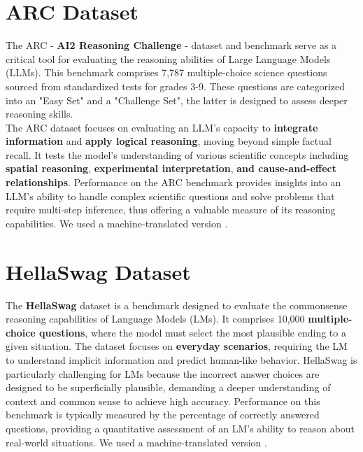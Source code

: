 \documentclass{article}
\begin{document}
	\appendix
	
	\section{ARC Dataset}
	The ARC - \textbf{AI2 Reasoning Challenge} - dataset and benchmark serve as a critical tool for evaluating the reasoning abilities of Large Language Models (LLMs). This benchmark comprises 7,787 multiple-choice science questions sourced from standardized tests for grades 3-9.  These questions are categorized into an "Easy Set" and a "Challenge Set", the latter is designed to assess deeper reasoning skills.  \\
	The ARC dataset focuses on evaluating an LLM's capacity to \textbf{integrate information} and \textbf{apply logical reasoning}, moving beyond simple factual recall.  It tests the model's understanding of various scientific concepts including \textbf{spatial reasoning}, \textbf{experimental interpretation}, \textbf{and cause-and-effect relationships}.  Performance on the ARC benchmark provides insights into an LLM's ability to handle complex scientific questions and solve problems that require multi-step inference, thus offering a valuable measure of its reasoning capabilities.
	We used a machine-translated version \cite{dac2023okapi}.
	
	\section{HellaSwag Dataset}
	The \textbf{HellaSwag} dataset is a benchmark designed to evaluate the commonsense reasoning capabilities of Language Models (LMs). It comprises 10,000 \textbf{multiple-choice questions}, where the model must select the most plausible ending to a given situation.  The dataset focuses on \textbf{everyday scenarios}, requiring the LM to understand implicit information and predict human-like behavior.  HellaSwag is particularly challenging for LMs because the incorrect answer choices are designed to be superficially plausible, demanding a deeper understanding of context and common sense to achieve high accuracy.  Performance on this benchmark is typically measured by the percentage of correctly answered questions, providing a quantitative assessment of an LM's ability to reason about real-world situations.
	We used a machine-translated version \cite{dac2023okapi}.
	
	
	
\end{document}
